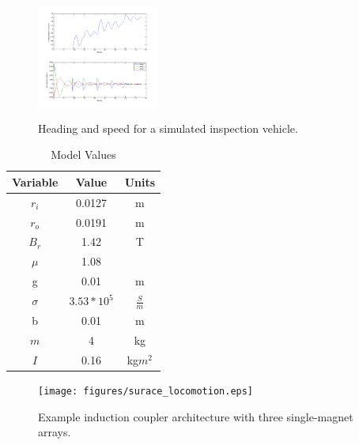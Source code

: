 \begin{figure}

\includegraphics[width = 4cm, height = 4cm ]{figures/theta_and_speed.png}
\caption{Heading and speed for a simulated inspection vehicle. }
\label{fig:theta_and_speeds}
\end{figure}



\begin{table}[ht]
\caption{Model Values} %
\centering %
\begin{tabular}{c c c} %
\hline\hline %
Variable & Value & Units\\ [0.5ex] %
\hline

$r_i$ & 0.0127 & m\\  
$r_o$ & 0.0191 & m \\
$B_r$ & 1.42 & T \\
$\mu$ & 1.08 & \\
g & 0.01 & m\\

$\sigma$ & $3.53 * 10^5$ & $\frac{S}{m}$ \\
b & 0.01 & m\\
$m$ & 4 & kg \\
$I$ & 0.16 & kg$m^2$

 \\ [1ex] %
\hline %
\end{tabular}
\label{table:values} %
\end{table}


\begin{figure}
\texttt{[image: figures/surace\_locomotion.eps]}
\label{fig:sample_coupler}
\caption{Example induction coupler architecture with three single-magnet arrays.}
\end{figure}